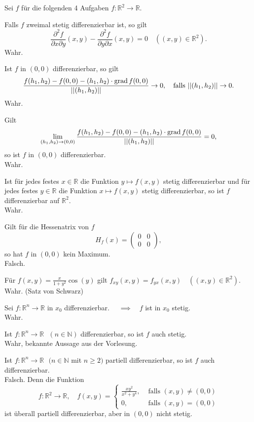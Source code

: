 \documentclass[parskip=full]{scrartcl}
\begin{document}
Sei $f$ für die folgenden 4 Aufgaben $f : \mathbb{R}^2 \to \mathbb{R}$.

Falls $f$ zweimal stetig differenzierbar ist, so gilt
\begin{displaymath}
  \frac{\partial^2 f}{\partial x \partial y}(x,y) - \frac{\partial^2 f}{\partial y \partial x}(x,y) = 0 \quad ((x,y) \in \mathbb{R}^2).
\end{displaymath}
Wahr.

Ist $f$ in $(0,0)$ differenzierbar, so gilt
\begin{displaymath}
  \frac{f(h_1, h_2) - f(0,0) - (h_1,h_2) \cdot \operatorname{grad} f(0,0)}{||(h_1, h_2)||} \to 0, \quad \text{falls } ||(h_1, h_2)|| \to 0.
\end{displaymath}
Wahr.

Gilt
\begin{displaymath}
  \lim_{(h_1, h_2) \to (0,0)} \frac{f(h_1, h_2) - f(0,0) - (h_1,h_2) \cdot \operatorname{grad} f(0,0)}{||(h_1, h_2)||} = 0,
\end{displaymath}
so ist $f$ in $(0,0)$ differenzierbar.\\
Wahr.

Ist für jedes festes $x\in \mathbb{R}$ die Funktion $y \mapsto f(x,y)$ stetig differenzierbar und für jedes festes $y \in \mathbb{R}$ die Funktion $x \mapsto f(x,y)$ stetig differenzierbar, so ist $f$ differenzierbar auf $\mathbb{R}^2$.\\
Wahr.

Gilt für die Hessenatrix von $f$
\begin{displaymath}
  H_f(x) = \begin{pmatrix} 0 & 0 \\ 0 & 0\end{pmatrix},
\end{displaymath}
so hat $f$ in $(0,0)$ kein Maximum.\\
Falsch.

Für $f(x,y) = \frac{x}{1 +y^2} \cos(y)$ gilt $f_{xy}(x,y) = f_{yx}(x,y) \quad ((x,y) \in \mathbb{R}^2)$.\\
Wahr. (Satz von Schwarz)

Sei $f : \mathbb{R}^n \to \mathbb{R}$ in $x_0$ differenzierbar. $\quad \implies \quad f$ ist in $x_0$ stetig.\\
Wahr.

Ist $f : \mathbb{R}^n \to \mathbb{R} \text{ } (n \in \mathbb{N})$ differenzierbar, so ist $f$ auch stetig.\\
Wahr, bekannte Aussage aus der Vorlesung.

Ist $f : \mathbb{R}^n \to \mathbb{R} \text{ } (n \in \mathbb{N}$ mit $n \geq 2)$ partiell differenzierbar, so ist $f$ auch differenzierbar.\\
Falsch.
Denn die Funktion
\begin{displaymath}
  f : \mathbb{R}^2 \to \mathbb{R}, \quad f(x,y) =
  \begin{cases}
    \frac{xy^2}{x^2+y^4},& \text{ falls } (x,y) \neq (0,0)\\
    0,& \text{ falls } (x,y) = (0,0)
  \end{cases}
\end{displaymath}
ist überall partiell differenzierbar, aber in $(0,0)$ nicht stetig.
\end{document}
